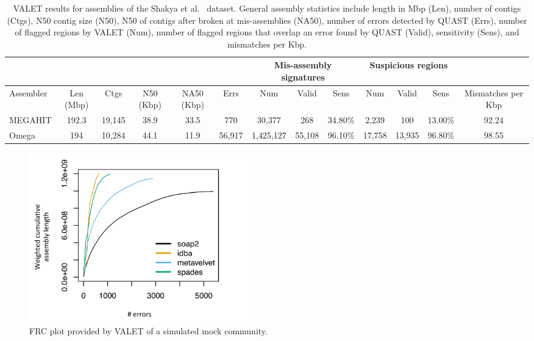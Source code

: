 \documentclass{article}
\begin{document}
\begin{landscape}
\begin{table}[tb!]
\centering
\footnotesize
\label{synthetic_valet}
\begin{tabular}{|l|c|c|c|c|c|c|c|c|c|c|c|c|}
  \hline
  \multicolumn{6}{|c}{} & \multicolumn{3}{|c|}{Mis-assembly signatures} & \multicolumn{3}{c|}{Suspicious regions}   &  \\
  \hline
  Assembler & Len (Mbp) & Ctgs   & N50 (Kbp) & NA50 (Kbp) & Errs   & Num       & Valid  & Sens    & Num    & Valid  & Sens    & Mismatches per Kbp \\
  \hline
  MEGAHIT   & 192.3     & 19,145 & 38.9      & 33.5       & 770    & 30,377    & 268    & 34.80\% & 2,239  & 100    & 13.00\% & 92.24              \\
  Omega     & 194       & 10,284 & 44.1      & 11.9       & 56,917 & 1,425,127 & 55,108 & 96.10\% & 17,758 & 13,935 & 96.80\% & 98.55 \\
  \hline
\end{tabular}
\caption[VALET results for assemblies of the Shakya et al.~\citep{shakya2013comparative} dataset]{VALET results for assemblies of the Shakya et al.~\citep{shakya2013comparative} dataset. General assembly statistics include length in Mbp (Len), number of contigs (Ctgs), N50 contig size (N50), N50 of contigs after broken at mis-assemblies (NA50), number of errors detected by QUAST (Errs), number of flagged regions by VALET (Num), number of flagged regions that overlap an error found by QUAST (Valid), sensitivity (Sens), and mismatches per Kbp.}
\end{table}

\end{landscape}

\begin{figure}[tb!]
\begin{center}
\includegraphics[width=3.86in]{figures/mock_frc}
\end{center}
\caption[FRC plot of a simulated mock community]{FRC plot provided by VALET of a simulated mock community.}
\label{fig:mock_frc}
\end{figure}
\end{document}
